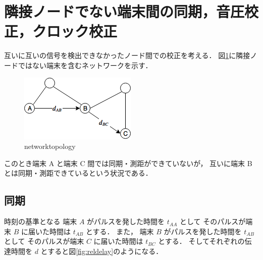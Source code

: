 \section{隣接ノードでない端末間の同期，音圧校正，クロック校正}


互いに互いの信号を検出できなかったノード間での校正を考える．
図\ref{fig:networktopology}に隣接ノードではない端末を含むネットワークを示す．

\begin{figure}[tb]\centering
  \hspace{-2mm}\includegraphics[clip,width=1.1\hsize]{img/network_topology.png}
  \caption{networktopology}\label{fig:networktopology}
\end{figure}

このとき端末 A と端末 C 間では同期・測距ができていないが，
互いに端末 B とは同期・測距できているという状況である．

\subsection{同期}

時刻の基準となる
端末 $A$ がパルスを発した時間を $t_{AA}$ として
そのパルスが端末 $B$ に届いた時間は $t_{AB}$ とする．
また，
端末 $B$ がパルスを発した時間を $t_{AB}$ として
そのパルスが端末 $C$ に届いた時間は $t_{BC}$ とする．
そしてそれぞれの伝達時間を $d$ とすると図\ref{fig:reldelay}のようになる．


